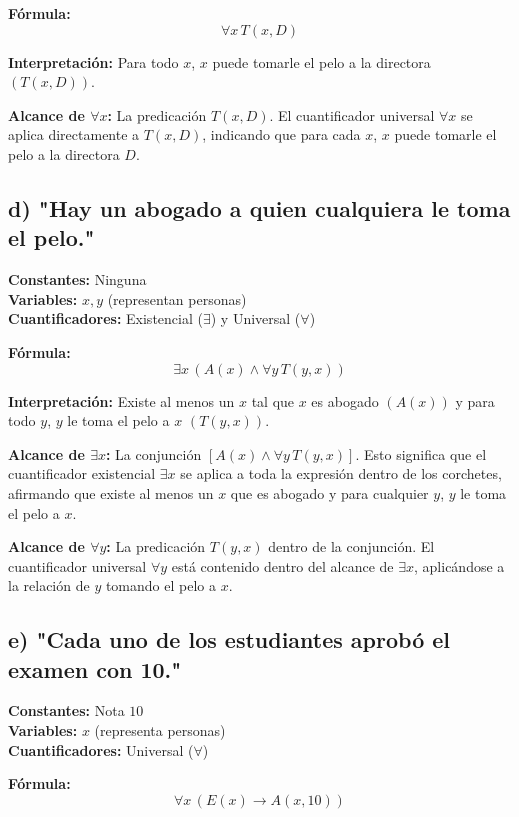 \documentclass[11pt,letterpaper]{article}
\begin{document}
\textbf{Fórmula:}
\[
\forall x \, T(x, D)
\]

\textbf{Interpretación:} Para todo \( x \), \( x \) puede tomarle el pelo a la directora \( (T(x, D)) \).

\textbf{ Alcance de \( \forall x \):}
La predicación \( T(x, D) \). El cuantificador universal \( \forall x \) se aplica directamente a \( T(x, D) \), indicando que para cada \( x \), \( x \) puede tomarle el pelo a la directora \( D \).

\subsection*{d) "Hay un abogado a quien cualquiera le toma el pelo."}

\textbf{Constantes:} Ninguna \\
\textbf{Variables:} \( x, y \) (representan personas) \\
\textbf{Cuantificadores:} Existencial (\( \exists \)) y Universal (\( \forall \))

\textbf{Fórmula:}
\[
\exists x \, (A(x) \land \forall y \, T(y, x))
\]

\textbf{Interpretación:} Existe al menos un \( x \) tal que \( x \) es abogado \( (A(x)) \) y para todo \( y \), \( y \) le toma el pelo a \( x \) \( (T(y, x)) \).

\textbf{Alcance de \( \exists x \):}
La conjunción \( [A(x) \land \forall y \, T(y, x)] \). Esto significa que el cuantificador existencial \( \exists x \) se aplica a toda la expresión dentro de los corchetes, afirmando que existe al menos un \( x \) que es abogado y para cualquier \( y \), \( y \) le toma el pelo a \( x \).

\textbf{Alcance de \( \forall y \):} La predicación \( T(y, x) \) dentro de la conjunción. El cuantificador universal \( \forall y \) está contenido dentro del alcance de \( \exists x \), aplicándose a la relación de \( y \) tomando el pelo a \( x \).


\subsection*{e) "Cada uno de los estudiantes aprobó el examen con 10."}

\textbf{Constantes:} Nota \( 10 \) \\
\textbf{Variables:} \( x \) (representa personas) \\
\textbf{Cuantificadores:} Universal (\( \forall \))

\textbf{Fórmula:}
\[
\forall x \, (E(x) \rightarrow A(x, 10))
\]
\end{document}
